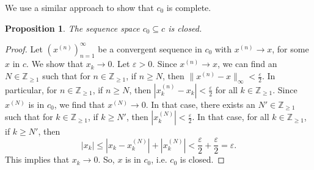 \documentclass[a4paper, openany]{memoir}
\theoremstyle{definition}
\theoremstyle{plain}
\newtheorem{proposition}[definition]{Proposition}
\begin{document}
We use a similar approach to show that $c_0$ is complete.
\begin{proposition}
    The sequence space $c_0 \subseteq c$ is closed.
\end{proposition}
\begin{proof}
    Let $(x^{(n)})_{n=1}^\infty$ be a convergent sequence in $c_0$ with $x^{(n)} \to x$, for some $x$ in $c$. We show that $x_k \to 0$. Let $\varepsilon > 0$. Since $x^{(n)} \to x$, we can find an $N \in \mathbb{Z}_{\geq 1}$ such that for $n \in \mathbb{Z}_{\geq 1}$, if $n \geq N$, then $\lVert x^{(n)} - x \rVert_\infty < \frac{\varepsilon}{2}$. In particular, for $n \in \mathbb{Z}_{\geq 1}$, if $n \geq N$, then $|x^{(n)}_k - x_k| < \frac{\varepsilon}{2}$ for all $k \in \mathbb{Z}_{\geq 1}$. Since $x^{(N)}$ is in $c_0$, we find that $x^{(N)} \to 0$. In that case, there exists an $N' \in \mathbb{Z}_{\geq 1}$ such that for $k \in \mathbb{Z}_{\geq 1}$, if $k \geq N'$, then $|x^{(N)}_k| < \frac{\varepsilon}{2}$. In that case, for all $k \in \mathbb{Z}_{\geq 1}$, if $k \geq N'$, then
    \[|x_k| \leq |x_k - x_k^{(N)}| + |x_k^{(N)}| < \frac{\varepsilon}{2} + \frac{\varepsilon}{2} = \varepsilon.\]
    This implies that $x_k \to 0$. So, $x$ is in $c_0$, i.e. $c_0$ is closed.
\end{proof}
\end{document}
